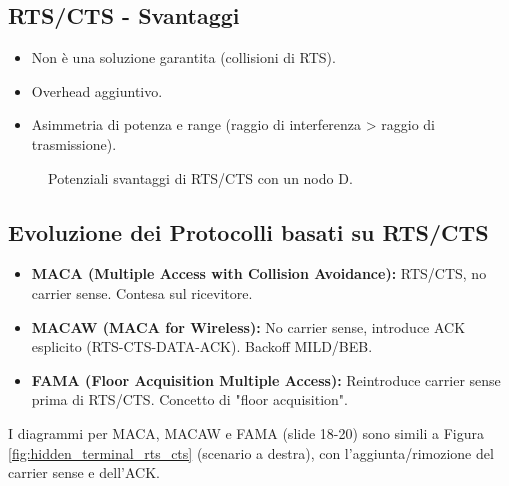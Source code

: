 \documentclass{article}
\begin{document}
\subsection{RTS/CTS - Svantaggi}
\begin{itemize}
    \item Non è una soluzione garantita (collisioni di RTS).
    \item Overhead aggiuntivo.
    \item Asimmetria di potenza e range (raggio di interferenza > raggio di trasmissione).
\end{itemize}
\begin{figure}[H]
\centering
{}
\caption{Potenziali svantaggi di RTS/CTS con un nodo D.}
\label{fig:rts_cts_drawbacks}
\end{figure}

\subsection{Evoluzione dei Protocolli basati su RTS/CTS}
\begin{itemize}
    \item \textbf{MACA (Multiple Access with Collision Avoidance):} RTS/CTS, no carrier sense. Contesa sul ricevitore.
    \item \textbf{MACAW (MACA for Wireless):} No carrier sense, introduce ACK esplicito (RTS-CTS-DATA-ACK). Backoff MILD/BEB.
    \item \textbf{FAMA (Floor Acquisition Multiple Access):} Reintroduce carrier sense prima di RTS/CTS. Concetto di "floor acquisition".
\end{itemize}
I diagrammi per MACA, MACAW e FAMA (slide 18-20) sono simili a Figura \ref{fig:hidden_terminal_rts_cts} (scenario a destra), con l'aggiunta/rimozione del carrier sense e dell'ACK.
\end{document}
